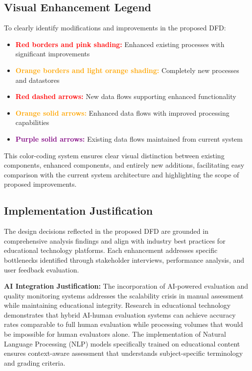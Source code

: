 \documentclass[12pt,a4paper,oneside]{book}
\begin{document}
\subsection{Visual Enhancement Legend}

To clearly identify modifications and improvements in the proposed DFD:

\begin{itemize}
    \item \textbf{\textcolor{red}{Red borders and pink shading:}} Enhanced existing processes with significant improvements
    \item \textbf{\textcolor{orange}{Orange borders and light orange shading:}} Completely new processes and datastores
    \item \textbf{\textcolor{red}{Red dashed arrows:}} New data flows supporting enhanced functionality
    \item \textbf{\textcolor{orange}{Orange solid arrows:}} Enhanced data flows with improved processing capabilities
    \item \textbf{\textcolor{purple}{Purple solid arrows:}} Existing data flows maintained from current system
\end{itemize}

This color-coding system ensures clear visual distinction between existing components, enhanced components, and entirely new additions, facilitating easy comparison with the current system architecture and highlighting the scope of proposed improvements.

\subsection{Implementation Justification}

The design decisions reflected in the proposed DFD are grounded in comprehensive analysis findings and align with industry best practices for educational technology platforms. Each enhancement addresses specific bottlenecks identified through stakeholder interviews, performance analysis, and user feedback evaluation.

\textbf{AI Integration Justification:}
The incorporation of AI-powered evaluation and quality monitoring systems addresses the scalability crisis in manual assessment while maintaining educational integrity. Research in educational technology demonstrates that hybrid AI-human evaluation systems can achieve accuracy rates comparable to full human evaluation while processing volumes that would be impossible for human evaluators alone. The implementation of Natural Language Processing (NLP) models specifically trained on educational content ensures context-aware assessment that understands subject-specific terminology and grading criteria.
\end{document}
